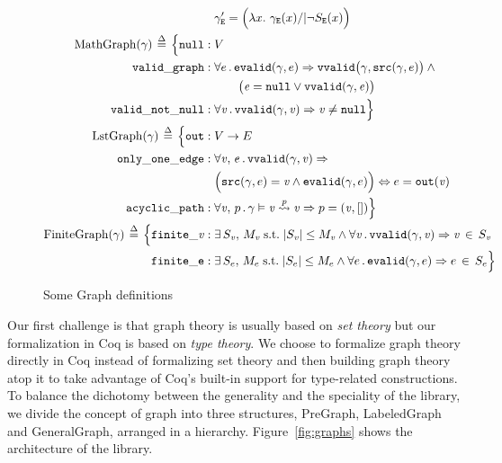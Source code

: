 \documentclass[acmsmall,review,anonymous]{acmart}\settopmatter{printfolios=true,printccs=false,printacmref=false}
\newcommand{\defeq}{\mathbin{\stackrel{\Delta}{=}}}
\begin{document}
\begin{figure}
\begin{gather*}
\begin{aligned}
       	 	&\gamma'_{\mathtt{E}} = \Big(\lambda x.~ \gamma_{\mathtt{E}}(x) /| \lnot S_{\mathtt{E}}(x)\Big)\\
\mathrm{MathGraph}(\gamma)\,\defeq\,\Big\{
          \mathtt{null}:\; & V\\ 
          \mathtt{valid\_graph}:\;& \forall e\,.\,\mathtt{evalid}(\gamma, e) \Rightarrow
          \mathtt{vvalid}\big(\gamma, \mathtt{src}(\gamma, e)\big)\wedge \null \\
          & \qquad \big(\m{e} = \mathtt{null} \vee \mathtt{vvalid}(\gamma, \m{e})\big)\\
          \mathtt{valid\_not\_null}:\;& \forall \m{v}\,.\,\mathtt{vvalid}(\gamma, \m{v})
          \Rightarrow \m{v} \neq \mathtt{null} \Big\} \\
        \mathrm{LstGraph}(\gamma)\,\defeq\, \Big\{
          \mathtt{out}:\; & V \rightarrow E\\
          \mathtt{only\_one\_edge}:\; & \forall \m{v},\,e\,.\,
          \mathtt{vvalid}(\gamma, \m{v}) \Rightarrow \\
          & \Big(\mathtt{src}(\gamma, e) =\m{v} \wedge
          \mathtt{evalid}(\gamma, e)\Big) \Leftrightarrow
          e = \mathtt{out}(\m{v})\\
         \mathtt{acyclic\_path}:\; & \forall \m{v},\,p\,.\,
         \gamma \vDash \m{v} \overset{p}{\leadsto} \m{v} \Rightarrow p = (\m{v},[])\Big\} \\
       	\mathrm{FiniteGraph}(\gamma)\,\defeq\, \Big\{
          \mathtt{finite\_\m{v}}:\;&\exists\, S_\m{v},\, M_\m{v}\;\text{s.t.}\;\lvert S_\m{v}\rvert
          \leq M_\m{v} \wedge
          \forall \m{v}\,.\, \mathtt{vvalid}(\gamma,\m{v})\Rightarrow \m{v}\,\in\,S_\m{v}\\
          \mathtt{finite\_e}:\;&\exists\, S_e,\, M_e\;\text{s.t.}\;\lvert S_e\rvert
          \leq M_e \wedge
          \forall e\,.\, \mathtt{evalid}(\gamma,e)\Rightarrow e\,\in\,S_e \Big\}
    	\end{aligned}
    \end{gather*}
\caption{Some Graph definitions}
\label{fig:graphdefns}
\vspace{-1em}
\end{figure} 
Our first challenge is that graph theory is usually based on
\emph{set theory} but our formalization in Coq is
based on \emph{type theory}. We choose to formalize graph theory
directly in Coq instead of formalizing set theory and then building
graph theory atop it to take advantage of Coq's built-in
support for type-related constructions.
To balance the dichotomy between
the generality and the speciality of the library, we divide the
concept of graph into three structures,
PreGraph, LabeledGraph and GeneralGraph, arranged in a hierarchy.
Figure~\ref{fig:graphs} shows the
architecture of the library.
\end{document}
